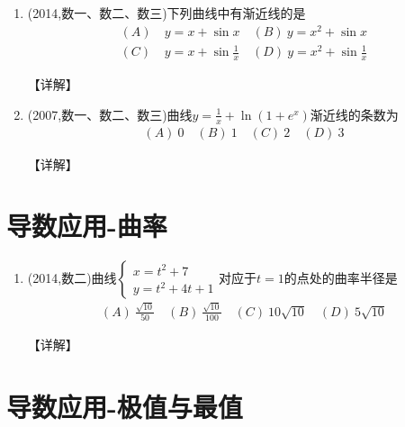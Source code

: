 \documentclass[12pt, a4paper, oneside, UTF8]{ctexbook}
\begin{document}
\begin{enumerate}[label=\arabic*.,start=13]
    \item  (2014,数一、数二、数三)下列曲线中有渐近线的是
    \begin{align*}
        (A)&\ y=x+\sin x \quad (B)\ y=x^2+\sin x \\
        (C)&\ y=x+\sin\frac{1}{x} \quad (D)\ y=x^2+\sin\frac{1}{x}
    \end{align*}
    
    \begin{solution}
    【详解】
    \end{solution}
    
    \item  (2007,数一、数二、数三)曲线$y=\frac{1}{x}+\ln(1+e^x)$渐近线的条数为
    \begin{align*}
        (A)\ 0 \quad (B)\ 1 \quad (C)\ 2 \quad (D)\ 3
    \end{align*}
    
    \begin{solution}
    【详解】
    \end{solution}
\end{enumerate}

\section{导数应用-曲率}

\begin{enumerate}[label=\arabic*.,start=15]
    \item  (2014,数二)曲线$\begin{cases}
        x=t^2+7 \\
        y=t^2+4t+1
    \end{cases}$对应于$t=1$的点处的曲率半径是
    \begin{align*}
        (A)\ \frac{\sqrt{10}}{50} \quad (B)\ \frac{\sqrt{10}}{100} \quad (C)\ 10\sqrt{10} \quad (D)\ 5\sqrt{10}
    \end{align*}
    
    \begin{solution}
    【详解】
    \end{solution}
\end{enumerate}

\section{导数应用-极值与最值}
\end{document}

